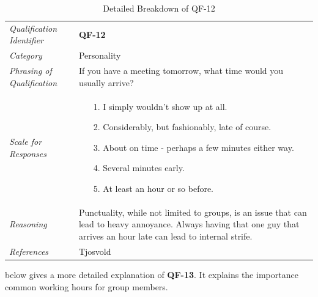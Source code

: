 \documentclass[12pt,letterpaper]{article}
\begin{document}
\begin{table}[H]
	\caption{Detailed Breakdown of QF-12}
	\begin{tabu} to 
		\toprule
		Qualification Identifier & {\bf QF-12}\\
		Category & Personality \\
		Phrasing of Qualification & If you have a meeting tomorrow, what time would you usually arrive? \\
		Scale for Responses &
		\begin{minipage}[t]{\linewidth}
			\begin{enumerate}
				\item[1.] I simply wouldn't show up at all.
				\item[2.] Considerably, but fashionably, late of course.
				\item[3.] About on time - perhaps a few minutes either way.
				\item[4.] Several minutes early.
				\item[5.] At least an hour or so before.
			\end{enumerate}
		\end{minipage}\\
		Reasoning & Punctuality, while not limited to groups, is an issue that can lead to heavy annoyance. Always having that one guy that arrives an hour late can lead to internal strife.\\
		References & Tjosvold\cite{tjosvold}\\
		\toprule
	\end{tabu}
\end{table}

\newpage{}

 below gives a more detailed explanation of {\bf QF-13}. It explains the importance common working hours for group members.
\end{document}
